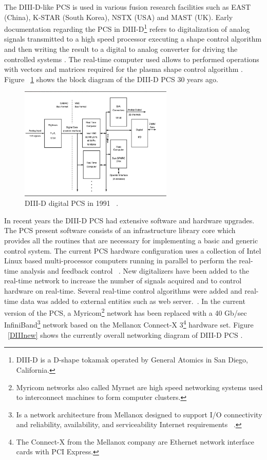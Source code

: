 The DIII-D-like PCS is used in various fusion research facilities such as EAST (China), K-STAR (South Korea), NSTX (USA) and MAST (UK). Early documentation regarding the PCS in DIII-D\footnote{DIII-D is a D-shape tokamak operated by General Atomics in San Diego, California. } refers to digitalization of analog signals transmitted to a high speed processor executing a shape control algorithm and then writing the result to a digital to analog converter for driving the controlled systems . The real-time computer used allows to performed operations with vectors and matrices required for the plasma shape control algorithm \cite{DIIDcontrol}. Figure ~\ref{DIII1991} shows the block diagram of the DIII-D PCS 30 years ago.
\smallskip

\begin{figure}[htbp]
	\centering
	\includegraphics[width=0.65\textwidth]{Chp2/DIIDPCS_old.png}
	\caption{\label{DIII1991} DIII-D digital PCS in 1991 ~\cite{DIIDcontrol}.  }
\end{figure}

In recent years the DIII-D PCS had extensive software and hardware upgrades. The PCS present software consists of an infrastructure library core which provides all the routines that are necessary for implementing a basic and generic control system. The current  PCS hardware configuration uses a collection of  Intel Linux based multi-processor computers running in parallel to perform the real-time analysis and feedback control ~\cite{DIIID2013}. New digitalizers have been added to the real-time network to increase the number of signals acquired and to control hardware on real-time. Several real-time control algorithms were added and real-time data was added to external entities such as web server.~\cite{DIIIDnew}. In the current version of the PCS, a Myricom\footnote{Myricom networks also called Myrnet are high speed networking systems used to interconnect machines to form computer clusters. } network has been replaced with a 40 Gb/sec InfiniBand\footnote{Is a network architecture from Mellanox designed to support I/O connectivity  and  reliability, availability, and serviceability Internet requirements ~\cite{MellanoxTechnologies2003}.  } network based on the Mellanox Connect-X 3\footnote{The Connect-X from the Mellanox company are Ethernet network interface cards with PCI Express.} hardware set. Figure ~\ref{DIIInew} shows the currently overall networking diagram of DIII-D PCS .


